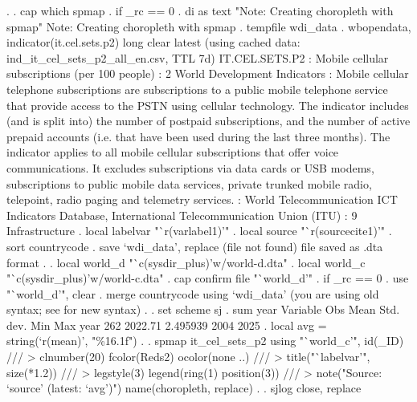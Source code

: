 . 
. cap which spmap
{\smallskip}
. if _rc == 0 {\lbr}
.     di as text "Note: Creating choropleth with spmap"
Note: Creating choropleth with spmap
.     tempfile wdi_data
.     wbopendata, indicator(it.cel.sets.p2) long clear latest
(using cached data: ind_it_cel_sets_p2_all_en.csv, TTL 7d)
{\smallskip}
    {} IT.CEL.SETS.P2
    {}: Mobile cellular subscriptions (per 100 people)
    {}: 2 World Development Indicators
    {}: Mobile cellular telephone subscriptions are subscriptions
    to a public mobile telephone service that provide access to the PSTN
    using cellular technology. The indicator includes (and is split into)
    the number of postpaid subscriptions, and the number of active prepaid
    accounts (i.e. that have been used during the last three months). The
    indicator applies to all mobile cellular subscriptions that offer voice
    communications. It excludes subscriptions via data cards or USB modems,
    subscriptions to public mobile data services, private trunked mobile
    radio, telepoint, radio paging and telemetry services.
    {}: World Telecommunication ICT Indicators Database, International
    Telecommunication Union (ITU)
    {}{}{\bftt{)}}: 9 Infrastructure
{\smallskip}
{\smallskip}
.     local labelvar "`r(varlabel1)'"
.     local source "`r(sourcecite1)'"
.     sort countrycode
.     save `wdi_data', replace
(file{} not found)
file{} saved as .dta
    format
. 
.     local world_d "`c(sysdir_plus)'w/world-d.dta"
.     local world_c "`c(sysdir_plus)'w/world-c.dta"
.     cap confirm file "`world_d'"
.     if _rc == 0 {\lbr}
.         use "`world_d'", clear
.         merge countrycode using `wdi_data'
(you are using old {} syntax; see {} for new syntax)
. 
.         set scheme sj
.         sum year
{\smallskip}
    Variable {\VBAR}        Obs        Mean    Std. dev.       Min        Max
        year {\VBAR}        262     2022.71    2.495939       2004       2025
.         local avg = string(`r(mean)', "\%16.1f")
. 
.         spmap it_cel_sets_p2 using "`world_c'", id(_ID) ///
>             clnumber(20) fcolor(Reds2) ocolor(none ..) ///
>             title("`labelvar'", size(*1.2)) ///
>             legstyle(3) legend(ring(1) position(3)) ///
>             note("Source: `source' (latest: `avg')") name(choropleth, replace)
. 
.         sjlog close, replace
{\smallskip}
